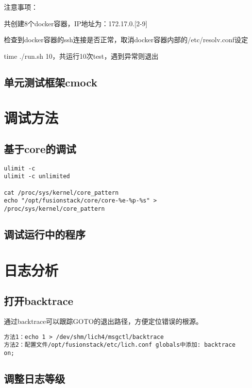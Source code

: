 注意事项：
\begin{compactenum}
\item 共创建8个docker容器，IP地址为：172.17.0.[2-9]
\item 检查到docker容器的ssh连接是否正常，取消docker容器内部的/etc/resolv.conf设定
\item time ./run.sh 10，共运行10次test，遇到异常则退出
\end{compactenum}

\subsection{单元测试框架cmock}

\section{调试方法}

\subsection{基于core的调试}

\begin{lstlisting}
ulimit -c
ulimit -c unlimited

cat /proc/sys/kernel/core_pattern
echo "/opt/fusionstack/core/core-%e-%p-%s" > /proc/sys/kernel/core_pattern
\end{lstlisting}

\subsection{调试运行中的程序}

\section{日志分析}

\subsection{打开backtrace}

通过backtrace可以跟踪GOTO的退出路径，方便定位错误的根源。

\begin{lstlisting}
方法1：echo 1 > /dev/shm/lich4/msgctl/backtrace
方法2：配置文件/opt/fusionstack/etc/lich.conf globals中添加: backtrace on;
\end{lstlisting}

\subsection{调整日志等级}

